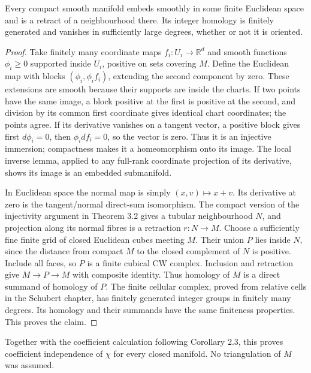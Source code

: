 \label{courseIII:duality:3.3}

\begin{lemma}
Every compact smooth manifold embeds smoothly in some finite Euclidean space and is a retract of a neighbourhood there. Its integer homology is finitely generated and vanishes in sufficiently large degrees, whether or not it is oriented.
\end{lemma}
\begin{proof}
Take finitely many coordinate maps \(f_i:U_i\to\mathbb R^d\) and smooth functions \(\phi_i\geq0\) supported inside \(U_i\), positive on sets covering \(M\). Define the Euclidean map with blocks \((\phi_i,\phi_i f_i)\), extending the second component by zero. These extensions are smooth because their supports are inside the charts. If two points have the same image, a block positive at the first is positive at the second, and division by its common first coordinate gives identical chart coordinates; the points agree. If its derivative vanishes on a tangent vector, a positive block gives first \(d\phi_i=0\), then \(\phi_i df_i=0\), so the vector is zero. Thus it is an injective immersion; compactness makes it a homeomorphism onto its image. The local inverse lemma, applied to any full-rank coordinate projection of its derivative, shows its image is an embedded submanifold.

In Euclidean space the normal map is simply \((x,v)\mapsto x+v\). Its derivative at zero is the tangent/normal direct-sum isomorphism. The compact version of the injectivity argument in Theorem 3.2 gives a tubular neighbourhood \(N\), and projection along its normal fibres is a retraction \(r:N\to M\). Choose a sufficiently fine finite grid of closed Euclidean cubes meeting \(M\). Their union \(P\) lies inside \(N\), since the distance from compact \(M\) to the closed complement of \(N\) is positive. Include all faces, so \(P\) is a finite cubical CW complex. Inclusion and retraction give \(M\to P\to M\) with composite identity. Thus homology of \(M\) is a direct summand of homology of \(P\). The finite cellular complex, proved from relative cells in the Schubert chapter, has finitely generated integer groups in finitely many degrees. Its homology and their summands have the same finiteness properties. This proves the claim.
\end{proof}

Together with the coefficient calculation following Corollary 2.3, this proves coefficient independence of \(\chi\) for every closed manifold. No triangulation of \(M\) was assumed.

